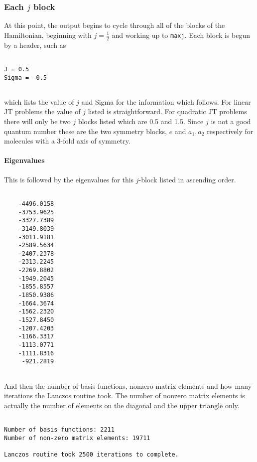 \documentclass{article}
\begin{document}
\subsubsection{Each $j$ block}

At this point, the output begins to cycle through all of the blocks of
the Hamiltonian, beginning with $j=\frac{1}{2} $ and working up to
{\tt maxj}. Each block is begun by a header, such as
\begin{verbatim}
 
J = 0.5
Sigma = -0.5
 
\end{verbatim}

which lists the value of $j$ and Sigma for the information which follows. For linear JT problems the value of $j$ listed is straightforward. For quadratic JT problems there will only be two $j$ blocks listed which are 0.5 and 1.5. Since $j$ is not a good quantum number these are the two symmetry blocks, $e$ and $a_1, a_2$ respectively for molecules with a 3-fold axis of symmetry.

\paragraph{Eigenvalues}
This is followed by the eigenvalues for this $j$-block listed in ascending order.

\begin{verbatim}

	-4496.0158
	-3753.9625
	-3327.7389
	-3149.8039
	-3011.9181
	-2589.5634
	-2407.2378
	-2313.2245
	-2269.8802
	-1949.2045
	-1855.8557
	-1850.9386
	-1664.3674
	-1562.2320
	-1527.8450
	-1207.4203
	-1166.3317
	-1113.0771
	-1111.8316
	 -921.2819
	 
\end{verbatim}

And then the number of basis functions, nonzero matrix elements and how many iterations the Lanczos routine took. The number of nonzero matrix elements is actually the number of elements on the diagonal and the upper triangle only. 

\begin{verbatim}
 
Number of basis functions: 2211
Number of non-zero matrix elements: 19711
 
Lanczos routine took 2500 iterations to complete.

\end{verbatim}
\end{document}
